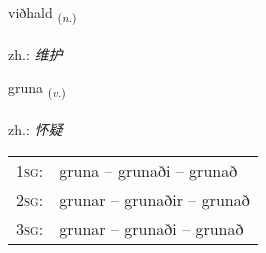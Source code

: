 \documentclass[frontgrid, backgrid]{flacards}\usepackage[]{graphicx}\usepackage[]{xcolor}
\begin{document}
\renewcommand{\flhead}{\vskip5pt \fboxsep=0pt {\small\bfseries\footnotesize Nafnorð | 名词}}
\renewcommand{\fcfoot}{\vskip5pt \fboxsep=0pt \hspace{2pt}{\small\bfseries\footnotesize 3K}}

\renewcommand{\blhead}{\vskip5pt {\small\bfseries\footnotesize Nafnorð | 名词 }}
\renewcommand{\bcfoot}{\vskip5pt \hspace{2pt}{\small\bfseries\footnotesize 3K}}


{viðhald \small{\textsubscript{(\textit{n.})}} \\[1ex] %
\textphonetic{[vɪθhalt]} \\
zh.: \emph{维护} \\  [2ex]
\renewcommand*{\arraystretch}{0.8}
}

\renewcommand{\flhead}{\vskip5pt \fboxsep=0pt {\small\bfseries\footnotesize Sagnorð | 动词}}
\renewcommand{\fcfoot}{\vskip5pt \fboxsep=0pt \hspace{2pt}{\small\bfseries\footnotesize 3K}}

\renewcommand{\blhead}{\vskip5pt {\small\bfseries\footnotesize Sagnorð | 动词 }}
\renewcommand{\bcfoot}{\vskip5pt \hspace{2pt}{\small\bfseries\footnotesize 3K}}


{gruna \small{\textsubscript{(\textit{v.})}} \\[1ex] %
\textphonetic{[krʏːna]} \\
zh.: \emph{怀疑} \\  [2ex]
\renewcommand*{\arraystretch}{0.8}
\begin{tabular}{p{1cm}l}
\textsc{1sg}: & gruna -- grunaði -- grunað \\ 
\textsc{2sg}: & grunar -- grunaðir -- grunað \\ 
\textsc{3sg}: & grunar -- grunaði -- grunað \\ 
\end{tabular}
}
\end{document}
